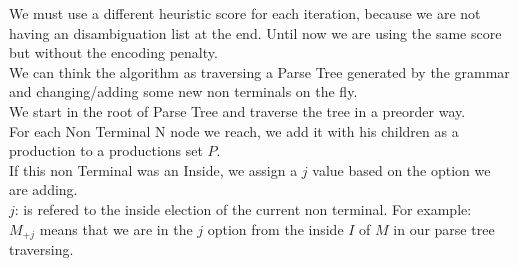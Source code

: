 	We must use a different heuristic score for each iteration, because we are not having
	an disambiguation list at the end. Until now we are using the same score but without
	the encoding penalty. \\

	We can think the algorithm as traversing a Parse Tree generated by the grammar and changing/adding some new non terminals on the fly. \\

	We start in the root of Parse Tree and traverse the tree in a preorder way. \\




	For each Non Terminal N node we reach, we add it with his children
	as a production to a productions set $P$. \\

	If this non Terminal was an Inside, we assign a $j$ value based on the option we
	are adding. \\

	$j$: is refered to the inside election of the current non terminal.
	For example:\\
	$M_{+j}$ means that we are in the $j$ option from the inside $I$ of $M$ in our parse tree traversing. \\

